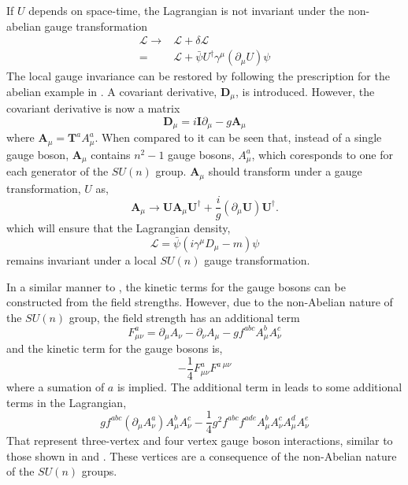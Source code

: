 If $U$ depends on space-time, the Lagrangian is not invariant under the
non-abelian gauge transformation
\begin{align}
\mathcal{L} \to & \mathcal{L} + \delta \mathcal{L} \\
= & \mathcal{L} + \bar{\psi} U^{\dagger} \gamma^{\mu} (\partial_{\mu} U) \psi
\end{align}
The local gauge invariance can be restored by following the prescription for the
abelian example in . A covariant derivative,
$\mathbf{D}_{\mu}$, is introduced.
However, the covariant derivative is now a matrix
\begin{equation}
\mathbf{D}_{\mu} = i \mathbf{I} \partial_{\mu} - g \mathbf{A}_{\mu}
\end{equation}
where $\mathbf{A}_{\mu} = \mathbf{T}^{a} A^{a}_{\mu}$. When compared to 
 it can be seen that, instead of a single gauge
boson, $\mathbf{A}_{\mu}$ contains $n^{2}-1$ gauge bosons, $A^{a}_{\mu}$, which
coresponds to one for each generator of the $SU(n)$ group.
$\mathbf{A}_{\mu}$ should transform under a gauge transformation, $U$ as,
\begin{equation}
\mathbf{A}_{\mu} \to 
\mathbf{U} \mathbf{A}_{\mu} \mathbf{U}^{\dagger}
+ \frac{i}{g} (\partial_{\mu} \mathbf{U}) \mathbf{U}^{\dagger}.
\end{equation}
which will ensure that the Lagrangian density,
\begin{equation}
\mathcal{L} = \bar{\psi}( i\gamma^{\mu} D_{\mu} - m)\psi 
\end{equation}
remains invariant under a local $SU(n)$ gauge transformation.

In a similar manner to , the kinetic terms
for the gauge bosons can be constructed from the field strengths. However, due
to the non-Abelian nature of the $SU(n)$ group, the field strength has an
additional term
\begin{equation}
F^{a}_{\mu\nu}
= \partial_{\mu} A_{\nu} - \partial_{\nu} A_{\mu} - g f^{abc} A^{b}_{\mu} A^{c}_{\nu}
\label{eq:nonabelfs}
\end{equation}
and the kinetic term for the gauge bosons is,
\begin{equation}
-\frac{1}{4}
F^{a}_{\mu\nu}
F^{a~\mu\nu}
\end{equation}
where a sumation of $a$ is implied.
The additional term in  leads to some additional terms in the
Lagrangian,
\begin{equation}
g f^{abc} ( \partial_{\mu} A^{a}_{\nu} ) A^{b}_{\mu} A^{c}_{\nu} - 
\frac{1}{4} g^{2} f^{abc} f^{ade} A^{b}_{\mu} A^{c}_{\nu} A^{d}_{\mu} A^{e}_{\nu}
\end{equation}
That represent three-vertex and four vertex gauge boson interactions, similar to
those shown in  and .  These
vertices are a consequence of the non-Abelian nature of the $SU(n)$ groups.

